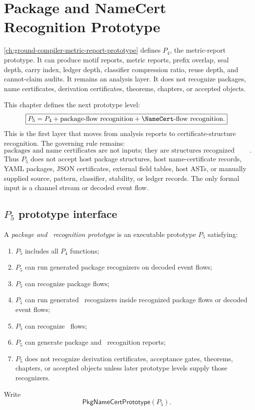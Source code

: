 \chapter{Package and NameCert Recognition Prototype}
\label{ch:ground-compiler-package-namecert-recognition-prototype}

\autoref{ch:ground-compiler-metric-report-prototype} defines $P_4$, the metric-report prototype. It can produce motif reports, metric reports, prefix overlap, seal depth, carry index, ledger depth, classifier compression ratio, reuse depth, and cannot-claim audits. It remains an analysis layer. It does not recognize packages, name certificates, derivation certificates, theorems, chapters, or accepted objects.

This chapter defines the next prototype level:
$$
  \boxed{P_5=P_4+\text{package-flow recognition}+\NameCert\text{-flow recognition}.}
$$
This is the first layer that moves from analysis reports to certificate-structure recognition. The governing rule remains:
$$
  \boxed{\text{packages and name certificates are not inputs; they are structures recognized inside decoded event flows}.}
$$
Thus $P_5$ does not accept host package structures, host name-certificate records, YAML packages, JSON certificates, external field tables, host ASTs, or manually supplied source, pattern, classifier, stability, or ledger records. The only formal input is a channel stream or decoded event flow.

\section{$P_5$ prototype interface}
\label{sec:pkg-namecert-p5-interface}

\begin{definition}
\label{def:pkg-namecert-p5-prototype}
A \emph{package and \NameCert\ recognition prototype} is an executable prototype $P_5$ satisfying:
\begin{enumerate}
\item $P_5$ includes all $P_4$ functions;
\item $P_5$ can run generated package recognizers on decoded event flows;
\item $P_5$ can recognize package flows;
\item $P_5$ can run generated \NameCert\ recognizers inside recognized package flows or decoded event flows;
\item $P_5$ can recognize \NameCert\ flows;
\item $P_5$ can generate package and \NameCert\ recognition reports;
\item $P_5$ does not recognize derivation certificates, acceptance gates, theorems, chapters, or accepted objects unless later prototype levels supply those recognizers.
\end{enumerate}
Write
$$
  \mathsf{PkgNameCertPrototype}(P_5).
$$
\end{definition}


